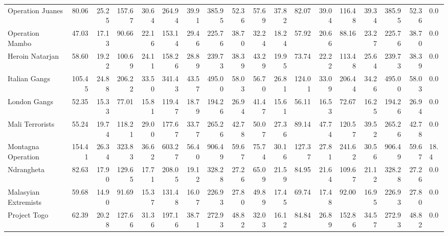\begin{tabular}{lrrrrrrrrrrrrrrrrl}
Operation Juanes     &             80.06 &  25.25 &  157.67 &  30.64 &  264.94 &  39.91 &  385.95 &  52.36 &            57.69 &   37.82 &   82.07 &   39.04 &  116.48 &   39.34 &  385.95 &  52.36 &        0.0 \\
Operation Mambo      &             47.03 &  17.13 &   90.66 &  22.16 &  153.14 &  29.46 &  225.76 &  38.70 &            32.24 &   18.24 &   57.92 &   20.66 &   88.16 &   23.27 &  225.76 &  38.70 &        0.0 \\
Heroin Natarjan      &             58.60 &  19.22 &  100.69 &  24.11 &  158.26 &  28.89 &  239.73 &  38.39 &            43.29 &   19.95 &   73.74 &   22.22 &  113.48 &   25.64 &  239.73 &  38.39 &        0.0 \\
Italian Gangs        &            105.45 &  24.88 &  206.22 &  33.50 &  341.43 &  43.57 &  495.00 &  58.03 &            56.70 &   26.81 &  124.01 &   33.09 &  206.44 &   34.26 &  495.00 &  58.03 &        0.0 \\
London Gangs         &             52.35 &  15.33 &   77.01 &  15.81 &  119.47 &  18.79 &  194.26 &  26.94 &            41.47 &   15.61 &   56.11 &   16.53 &   72.67 &   16.25 &  194.26 &  26.94 &        0.0 \\
Mali Terrorists      &             55.24 &  19.74 &  118.21 &  29.00 &  177.67 &  33.77 &  265.26 &  42.78 &            50.07 &   27.36 &   89.14 &   47.74 &  120.57 &   39.52 &  265.26 &  42.78 &        0.0 \\
Montagna Operation   &            154.41 &  26.34 &  323.83 &  36.62 &  603.27 &  56.40 &  906.49 &  59.67 &            75.74 &   30.16 &  127.37 &   27.81 &  241.62 &   30.56 &  906.49 &  59.67 &       18.4 \\
Ndrangheta           &             82.63 &  17.90 &  129.65 &  17.71 &  208.05 &  19.12 &  328.28 &  27.26 &            65.09 &   21.59 &   84.95 &   21.64 &  109.67 &   21.12 &  328.28 &  27.26 &        0.0 \\
Malasyian Extremists &             59.68 &  14.90 &   91.69 &  15.37 &  131.48 &  16.07 &  226.93 &  27.80 &            49.89 &   17.45 &   69.74 &   17.48 &   92.00 &   16.95 &  226.93 &  27.80 &        0.0 \\
Project Togo         &             62.39 &  20.28 &  127.66 &  31.36 &  197.16 &  38.71 &  272.93 &  48.82 &            32.03 &   16.12 &   84.84 &   26.89 &  152.86 &   34.57 &  272.93 &  48.82 &        0.0 \\
\bottomrule
\end{tabular}
